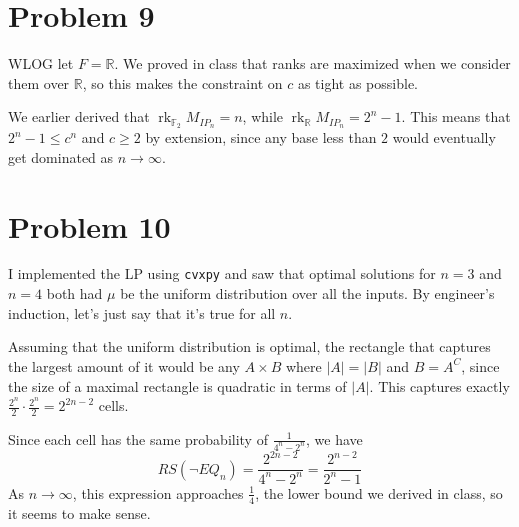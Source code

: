 \documentclass[12pt]{article}
\DeclareMathOperator{\rk}{rk}
\begin{document}
\newpage

\section*{Problem 9}

WLOG let $F=\mathbb{R}$.
We proved in class that ranks are maximized when we consider them over $\mathbb{R}$,
so this makes the constraint on $c$ as tight as possible.

We earlier derived that $\rk_{\mathbb{F}_2} M_{IP_n}=n$, while $\rk_{\mathbb{R}} M_{IP_n}=2^n-1$.
This means that $2^n-1 \le c^n$ and $c \ge 2$ by extension, since any base less than $2$
would eventually get dominated as $n \to \infty$.

\newpage

\section*{Problem 10}

I implemented the LP using \verb|cvxpy| and saw that optimal solutions for $n=3$ and $n=4$
both had $\mu$ be the uniform distribution over all the inputs.
By engineer's induction, let's just say that it's true for all $n$.

Assuming that the uniform distribution is optimal, the rectangle that captures
the largest amount of it would be any $A \times B$ where $|A|=|B|$ and $B=A^C$,
since the size of a maximal rectangle is quadratic in terms of $|A|$.
This captures exactly $\frac{2^n}{2} \cdot \frac{2^n}{2}=2^{2n-2}$ cells.

Since each cell has the same probability of $\frac{1}{4^n-2^n}$, we have
\[RS(\lnot EQ_n)=\frac{2^{2n-2}}{4^n-2^n}=\boxed{\frac{2^{n-2}}{2^n-1}}\]
As $n \to \infty$, this expression approaches $\frac{1}{4}$, the lower
bound we derived in class, so it seems to make sense.
\end{document}
